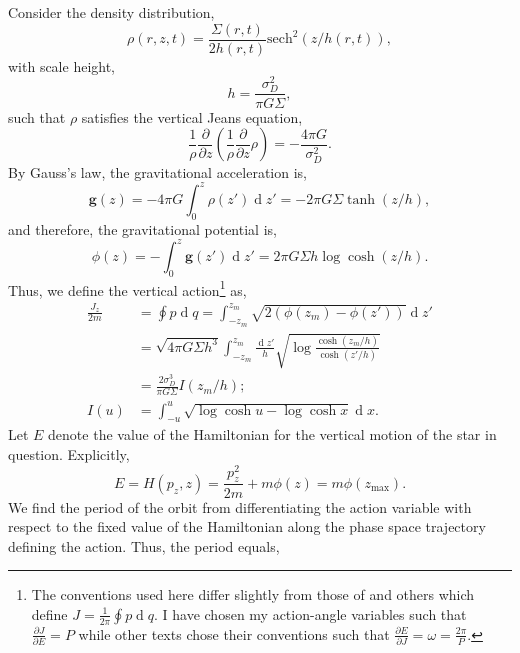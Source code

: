 \documentclass[usenatbib]{mnras}
\renewcommand{\d}[1]{\! \mathrm{d}#1 \:}
\newcommand{\pderiv}[2]{\frac{\partial{#1}}{\partial{#2}}}
\newcommand{\sech}{\mathrm{sech}}
\renewcommand{\d}[1]{\ensuremath{\operatorname{d}\!{#1}}}
\begin{document}
Consider the density distribution,
\begin{equation} 
\rho(r, z, t) = \frac{\Sigma(r,t)}{2 h(r, t)} \sech^2{(z/h(r,t))}, 
\end{equation}
with scale height,
\begin{equation}
h = \frac{\sigma_D^2}{\pi G \Sigma},
\end{equation}
such that $\rho$ satisfies the vertical Jeans equation,
\begin{equation}
\frac{1}{\rho} \pderiv{}{z} \left( \frac{1}{\rho} \pderiv{}{z} \rho \right) = - \frac{4 \pi G}{\sigma_D^2}.
\end{equation}
By Gauss's law, {\color{red} the} gravitational acceleration is,
\begin{equation}
\mathbf{g}(z) = -4 \pi G \int_0^z \rho(z') \d{z'} = -2 \pi G \Sigma \tanh{(z / h)}, 
\end{equation}
and therefore, the gravitational potential is,
\begin{equation}
\phi(z) = - \int_0^z \mathbf{g}(z') \d{z'} = 2 \pi G \Sigma h \log{\cosh{(z / h)}}.
\end{equation}
Thus, we define the vertical action\footnote{The conventions used here differ slightly from those of \cite{binney_tremaine_2008} and others which define $J = \frac{1}{2\pi} \oint p \d{q}$. I have chosen my action-angle variables such that $\pderiv{J}{E} = P$ while other texts chose their conventions such that $\pderiv{E}{J} = \omega = \frac{2 \pi}{P}$.} as,
\begin{subequations}
\begin{align}
\frac{J_z}{2m} & = \oint p \d{q} = \int_{-z_m}^{z_m} \sqrt{2(\phi(z_m) - \phi(z'))} \d{z'} 
\\
& = \sqrt{4 \pi G \Sigma h^3} \int_{-z_m}^{z_m} \frac{\d{z'}}{h}  \sqrt{\log{\frac{\cosh{(z_m / h)}}{\cosh{(z'/ h)}}}}
\\
& = \frac{2 \sigma_D^3}{\pi G \Sigma} I(z_m / h);
\\
I(u) & = \int_{-u}^u \sqrt{\log{\cosh{u}} - \log{\cosh{x}}} \d{x}.
\end{align}
\end{subequations}
Let $E$ denote the value {\color{red} of the} Hamiltonian for the vertical motion of the star in question. Explicitly, 
\begin{equation}
E = H(p_z, z) = \frac{p_z^2}{2 m} + m \phi(z) = m \phi(z_{\text{max}}).  
\end{equation}
We find the period of the orbit from differentiating the action variable with respect to the fixed value of the Hamiltonian along the phase space trajectory defining the action. Thus, the period equals,
\end{document}
